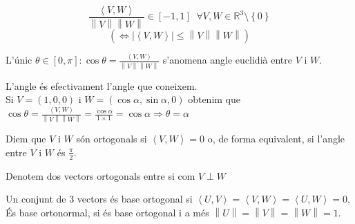 \documentclass[../main.tex]{subfiles}
\begin{document}
\begin{displaymath}
    \frac{\left\langle V, W\right\rangle}{\left\lVert V\right\rVert\left\lVert W\right\rVert } \in \left[-1, 1\right]\;\;\forall V, W \in \mathbb{R}^3\setminus\left\{0\right\}
\end{displaymath}
\begin{displaymath}
    \left(\iff \left\lvert \left\langle V, W\right\rangle \right\rvert\leq\left\lVert V\right\rVert\left\lVert W\right\rVert\right)
\end{displaymath}
\begin{definicio}
    L'únic $\theta \in \left[0, \pi\right] : \cos{\theta} = \frac{\left\langle V, W\right\rangle}{\left\lVert V\right\rVert\left\lVert W\right\rVert }$
    s'anomena angle euclidià entre $V\text{ i }W$.
\end{definicio}
L'angle és efectivament l'angle que coneixem.\\
Si $V = (1,0,0)\text{ i }W = (\cos{\alpha}, \sin{\alpha}, 0)$ obtenim que $\cos{\theta} = \frac{\left\langle V, W\right\rangle}{\left\lVert V\right\rVert\left\lVert W\right\rVert } = \frac{\cos{\alpha}}{1\times1} = \cos{\alpha} \Rightarrow \theta = \alpha$
\begin{definicio}
    Diem que $V\text{ i }W$ són ortogonals si $\left\langle V, W\right\rangle = 0$ o, de forma
    equivalent, si l'angle entre $V\text{ i }W$ és $\frac{\pi}{2}$.\\
    \begin{notacio}
        Denotem dos vectors ortogonals entre si com $V\perp W$
    \end{notacio}
    Un conjunt de 3 vectors és base ortogonal si $\left\langle U, V\right\rangle = \left\langle V, W\right\rangle = \left\langle U, W\right\rangle = 0$,
    És base ortonormal, si és base ortogonal i a més $\left\lVert U\right\rVert = \left\lVert V\right\rVert = \left\lVert W\right\rVert = 1$.
\end{definicio}
\end{document}
